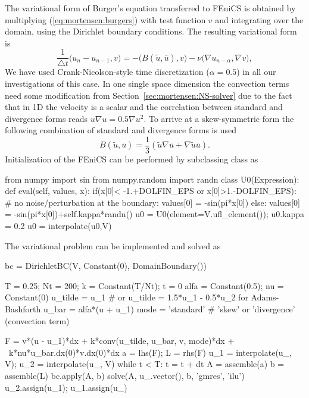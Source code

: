 The variational form of Burger's equation transferred to FEniCS is obtained by multiplying (\eqref{eq:mortensen:burgers}) with test function $v$ and integrating over the domain, using the Dirichlet boundary conditions. The resulting variational form is
\begin{equation}
 \frac{1}{\triangle t}\bigl( u_{n} - u_{n-1} , v\bigr) = - \bigl(B(\tilde{u},\overline{u}), v \bigr) - \nu \bigl( \nabla u_{n-\alpha}, \nabla v \bigr),
\label{eq:mortensen:burgers_vf}
\end{equation}
We have used Crank-Nicolson-style time discretization ($\alpha=0.5$) in all our investigations of this case. In one single space dimension the convection terms need some modification from Section~\ref{sec:mortensen:NS-solver} due to the fact that in 1D the velocity is a scalar and the correlation between standard and divergence forms reads $u\nabla u =0.5 \nabla u^2$. To arrive at a skew-symmetric form the following combination of standard and divergence forms is used
\begin{equation}
 B(\tilde{u},\overline{u}) = \frac{1}{3}\left( \tilde{u}\nabla \overline{u} + \nabla \tilde{u} \overline{u} \right).
\end{equation}
Initialization of the FEniCS
 can be performed by subclassing  class
 as
\begin{python}
from numpy import sin
from numpy.random import randn
class U0(Expression):
    def eval(self, values, x):
        if(x[0]< -1.+DOLFIN_EPS or x[0]>1.-DOLFIN_EPS):
            # no noise/perturbation at the boundary:
            values[0] = -sin(pi*x[0])
        else:
            values[0] = -sin(pi*x[0])+self.kappa*randn()
u0 = U0(element=V.ufl_element()); u0.kappa = 0.2
u0 = interpolate(u0,V)
\end{python}
The variational problem can be implemented and solved as
\begin{python}
bc = DirichletBC(V, Constant(0), DomainBoundary())

T = 0.25; Nt = 200; k = Constant(T/Nt); t = 0
alfa = Constant(0.5); nu = Constant(0)
u_tilde = u_1 # or u_tilde = 1.5*u_1 - 0.5*u_2 for Adams-Bashforth
u_bar = alfa*(u + u_1)
mode = 'standard'  # 'skew' or 'divergence' (convection term)

F = v*(u - u_1)*dx + k*conv(u_tilde, u_bar, v, mode)*dx + \
    k*nu*u_bar.dx(0)*v.dx(0)*dx
a = lhs(F); L = rhs(F)
u_1 = interpolate(u_, V); u_2 = interpolate(u_, V)
while t < T:
    t = t + dt
    A = assemble(a)
    b = assemble(L)
    bc.apply(A, b)
    solve(A, u_.vector(), b, 'gmres', 'ilu')
    u_2.assign(u_1); u_1.assign(u_)
\end{python}

